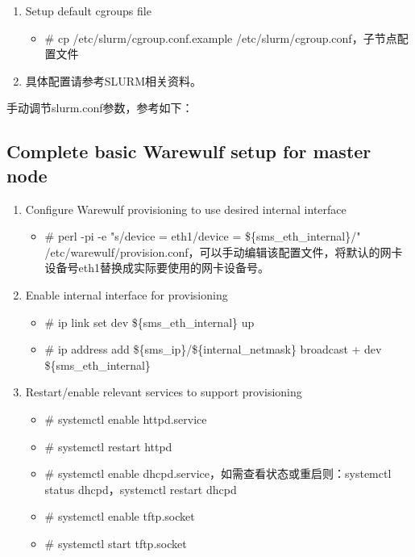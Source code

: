 {\begin{enumerate}
\item Setup default cgroups file
\begin{itemize}
\item \# cp /etc/slurm/cgroup.conf.example /etc/slurm/cgroup.conf，子节点配置文件
\end{itemize}

\item 具体配置请参考SLURM相关资料。
\end{enumerate}
手动调节slurm.conf参数，参考如下：




\subsection{Complete basic Warewulf setup for master node}
\begin{enumerate}
\item Configure Warewulf provisioning to use desired internal interface
\begin{itemize}
\item \#  perl -pi -e "s/device = eth1/device = \$\{sms\_eth\_internal\}/" /etc/warewulf/provision.conf，可以手动编辑该配置文件，将默认的网卡设备号eth1替换成实际要使用的网卡设备号。
\end{itemize}

\item Enable internal interface for provisioning
\begin{itemize}
\item \# ip link set dev \$\{sms\_eth\_internal\} up
\item \# ip address add \$\{sms\_ip\}/\$\{internal\_netmask\} broadcast + dev \$\{sms\_eth\_internal\}
\end{itemize}

\item Restart/enable relevant services to support provisioning
\begin{itemize}
\item \# systemctl enable httpd.service
\item \# systemctl restart httpd
\item \# systemctl enable dhcpd.service，如需查看状态或重启则：systemctl status dhcpd，systemctl restart dhcpd
\item \# systemctl enable tftp.socket
\item \# systemctl start tftp.socket
\end{itemize}
\end{enumerate}

}
